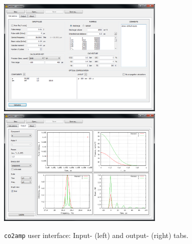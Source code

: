 \documentclass{report}
\begin{document}
\begin{figure}[ht]
\centering
\includegraphics[width=8cm]{images/co2amp-input}
\includegraphics[width=8cm]{images/co2amp-output}
\caption{\texttt{co2amp} user interface: Input- (left) and output- (right) tabs.}\label{fig:co2amp}
\end{figure}
\end{document}
